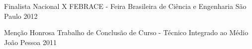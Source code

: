 \begin{cvhonors}
  \cvhonor
    {Finalista Nacional}
    {X FEBRACE - Feira Brasileira de Ciência e Engenharia}
    {São Paulo}
    {2012} %

  \cvhonor
    {Menção Honrosa}
    {Trabalho de Conclusão de Curso - Técnico Integrado ao Médio}
    {João Pessoa}
    {2011} %
%
\end{cvhonors}
